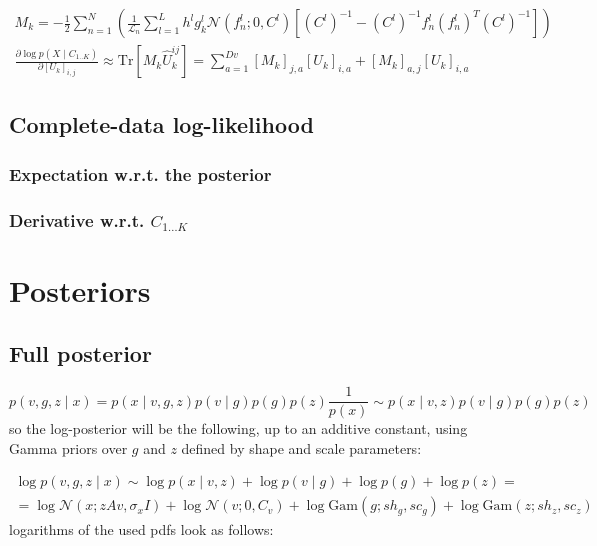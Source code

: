 \documentclass{paper}
\begin{document}
\begin{eqnarray}
M_k = -\frac{1}{2} \sum_{n=1}^N \left(\frac{1}{\mathcal{L}_n}  \sum_{l=1}^{L} h^l g^l_k \mathcal{N}(f_n^l;0,C^l)   \left[ (C^l)^{-1} - (C^l)^{-1} f_n^l (f_n^l)^T (C^l)^{-1} \right] \right) \\
\frac{\partial \log p(X \mid C_{1..K})}{\partial \left[ U_k \right]_{i,j}} \approx \textrm{Tr} \left[M_k \hat U_k^{ij} \right] = \sum_{a=1}^{Dv} \left[ M_k \right]_{j,a} \left[ U_k \right]_{i,a} + \left[ M_k \right]_{a,j} \left[ U_k \right]_{i,a}
\end{eqnarray}


\subsection{Complete-data log-likelihood}

\subsubsection{Expectation w.r.t. the posterior}
\subsubsection{Derivative w.r.t. $C_{1\dots K}$}


\section{Posteriors}

\subsection{Full posterior}

\begin{equation}
p(v,g,z \mid x) = p(x \mid v,g,z) p(v \mid g) p(g) p(z) \frac{1}{p(x)} \sim  p(x \mid v,z) p(v \mid g) p(g) p(z)
\end{equation}
%
so the log-posterior will be the following, up to an additive constant, using Gamma priors over $g$ and $z$ defined by shape and scale parameters:

\begin{equation}
\begin{split}
\log p(v,g,z \mid x) \sim \log p(x \mid v,z) + \log p(v \mid g) + \log p(g) + \log p(z) = \\
= \log \mathcal{N}(x;zAv,\sigma_x I) + \log \mathcal{N}(v;0,C_v) + \log \textrm{Gam}(g;sh_g,sc_g) + \log \textrm{Gam}(z;sh_z,sc_z)
\end{split}
\end{equation}
%
logarithms of the used pdfs look as follows:
\end{document}

